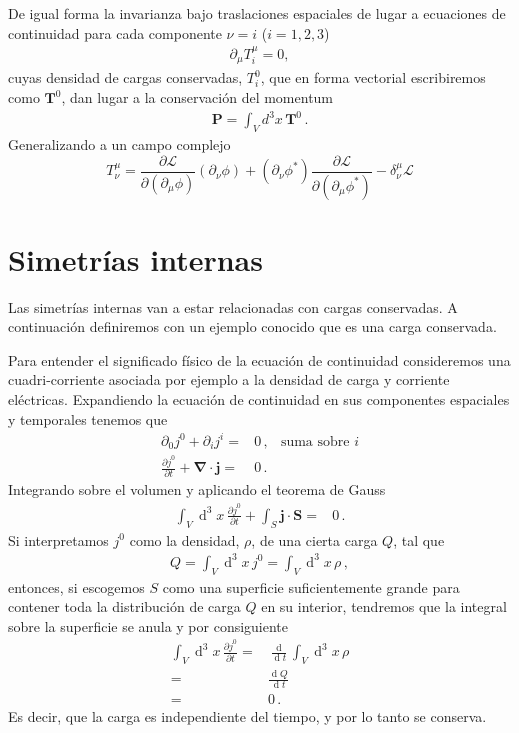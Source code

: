 De igual forma la invarianza bajo traslaciones espaciales de lugar a ecuaciones de continuidad para cada componente $\nu=i$
 ($i=1,2,3$)
 \begin{align}
   \label{eq:235}
   \partial_\mu T^\mu_i=0,
 \end{align}
cuyas densidad de cargas conservadas, $T^0_i$, que en forma vectorial escribiremos como $\mathbf{T}^0$, dan lugar a la conservaci\'on del momentum
\begin{align}
  \mathbf{P}=\int_V d^3x\,\mathbf{T}^0\,.
\end{align}
Generalizando a un campo complejo
\begin{equation}
  \label{eq:138}
     T^\mu_\nu=\frac{\partial\mathcal{L}}{\partial(\partial_\mu\phi)}(\partial_\nu\phi)+(\partial_\nu\phi^*)\frac{\partial\mathcal{L}}{\partial(\partial_\mu\phi^*)}
      -\delta^\mu_\nu\mathcal{L}
\end{equation}


\section{Simetrías internas}

Las simetrías internas van a estar relacionadas con cargas conservadas. A continuación definiremos con un ejemplo conocido que es una carga conservada.

Para entender el significado físico de la ecuación de continuidad consideremos una cuadri-corriente asociada por ejemplo a la densidad de carga y corriente eléctricas. Expandiendo la ecuación de continuidad en sus componentes espaciales y temporales tenemos que
\begin{align}
  \partial_0 j^0+ \partial_i j^i=&0\,,&\text{suma sobre $i$}\nonumber\\
  \frac{\partial j^0}{\partial t}+ \boldsymbol{\nabla}\cdot\boldsymbol{j}=&0\,.
\end{align}
Integrando sobre el volumen y aplicando el teorema de Gauss
\begin{align}
  \int_V \operatorname{d}^3x\,\frac{\partial j^0}{\partial t}
+\int_S \boldsymbol{j}\cdot \boldsymbol{S}=&0\,.
\end{align}
Si interpretamos $j^0$ como la densidad, $\rho$, de una cierta carga $Q$, tal que
\begin{align}
  Q=\int_{V} \operatorname{d}^3x\, j^0= \int_{V} \operatorname{d}^3x\, \rho\,,
\end{align}
entonces, si escogemos $S$ como una superficie suficientemente grande para contener toda la distribución de carga $Q$ en su interior, tendremos que la integral sobre la superficie se anula y por consiguiente
\begin{align}
  \int_V \operatorname{d}^3x\,\frac{\partial j^0}{\partial t}=&
\frac{\operatorname{d}}{\operatorname{d}t}\int_V \operatorname{d}^3x\,\rho \nonumber\\
=&\frac{\operatorname{d}Q}{\operatorname{d}t}\nonumber\\
  =&0\,.
\end{align}
Es decir, que la carga es independiente del tiempo, y por lo tanto se conserva.

